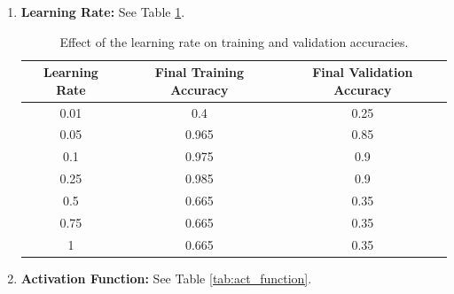 \documentclass{article}
\begin{document}
\begin{enumerate}
  \item \textbf{Learning Rate:} See Table \ref{tab:learning_rate}.
        \begin{table}[ht]
          \label{tab:learning_rate}
          \begin{center}
            \caption{Effect of the learning rate on training and validation accuracies.}
            \begin{tabular}{|c|c|c|}
              \hline
              Learning Rate & Final Training Accuracy & Final Validation Accuracy \\ \hline
              0.01          & 0.4                     & 0.25                      \\ \hline
              0.05          & 0.965                   & 0.85                      \\ \hline
              0.1           & 0.975                   & 0.9                       \\ \hline
              0.25          & 0.985                   & 0.9                       \\ \hline
              0.5           & 0.665                   & 0.35                      \\ \hline
              0.75          & 0.665                   & 0.35                      \\ \hline
              1             & 0.665                   & 0.35                      \\ \hline
            \end{tabular}
          \end{center}
        \end{table}

  \item \textbf{Activation Function:} See Table \ref{tab:act_function}.


\end{enumerate}
\end{document}
